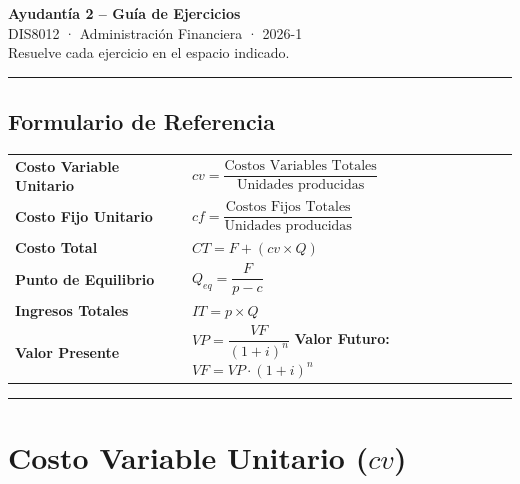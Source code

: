 \documentclass[12pt,a4paper]{article}
\begin{document}
\begin{center}
  {\LARGE \textbf{Ayudantía 2 -- Guía de Ejercicios}}\\[0.4em]
  {\large DIS8012 · Administración Financiera · 2026-1}\\[0.2em]
  {\normalsize Resuelve cada ejercicio en el espacio indicado.}
\end{center}

\vspace{0.5em}
\noindent\rule{\textwidth}{0.8pt}
\vspace{0.3em}

\subsection*{Formulario de Referencia}

\begin{formulabox}
\begin{center}
\renewcommand{\arraystretch}{2.2}
\begin{tabular}{ll}
  \textbf{Costo Variable Unitario} & $cv = \dfrac{\text{Costos Variables Totales}}{\text{Unidades producidas}}$ \\[4pt]
  \textbf{Costo Fijo Unitario}     & $cf = \dfrac{\text{Costos Fijos Totales}}{\text{Unidades producidas}}$ \\[4pt]
  \textbf{Costo Total}             & $CT = F + (cv \times Q)$ \\[4pt]
  \textbf{Punto de Equilibrio}     & $Q_{eq} = \dfrac{F}{p - c}$ \\[4pt]
  \textbf{Ingresos Totales}        & $IT = p \times Q$ \\[4pt]
  \textbf{Valor Presente}          & $VP = \dfrac{VF}{(1+i)^n}$ \quad\quad \textbf{Valor Futuro:} $VF = VP \cdot (1+i)^n$ \\
\end{tabular}
\end{center}
\end{formulabox}

\vspace{0.6em}
\noindent\rule{\textwidth}{0.8pt}

\section{Costo Variable Unitario ($cv$)}
\end{document}
